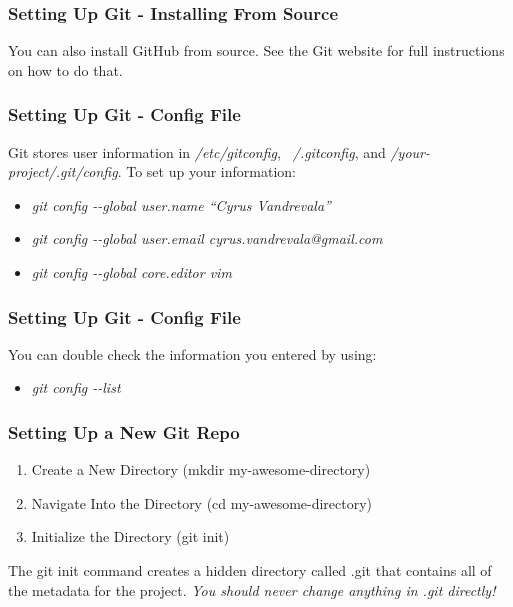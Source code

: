 \begin{frame}
\frametitle{\large{Setting Up Git - Installing From Source}}
You can also install GitHub from source. See the Git website for full instructions on how to do that.
\end{frame}

\begin{frame}
\frametitle{\large{Setting Up Git - Config File}}
Git stores user information in \emph{/etc/gitconfig}, \emph{~/.gitconfig}, and \emph{/your-project/.git/config}. To set up your information: \\
\begin{itemize}
\item \emph{git config -{}-global user.name ``Cyrus Vandrevala''}
\item \emph{git config -{}-global user.email cyrus.vandrevala@gmail.com}
\item \emph{git config -{}-global core.editor vim}
\end{itemize}
\end{frame}

\begin{frame}
\frametitle{\large{Setting Up Git - Config File}}
You can double check the information you entered by using: \\
\begin{itemize}
\item \emph{git config -{}-list}
\end{itemize}
\end{frame}

\begin{frame}
\frametitle{\large{Setting Up a New Git Repo}}
\begin{enumerate}
\item Create a New Directory (mkdir my-awesome-directory)
\item Navigate Into the Directory (cd my-awesome-directory)
\item Initialize the Directory (git init)
\end{enumerate}
\vspace{5mm}
The git init command creates a hidden directory called .git that contains all of the metadata for the project. \emph{You should never change anything in .git directly!}
\end{frame}
\note{}

